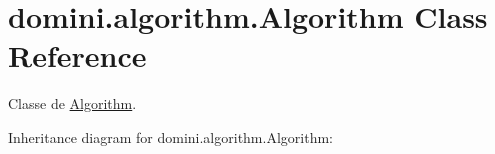 \hypertarget{classdomini_1_1algorithm_1_1Algorithm}{}\section{domini.\+algorithm.\+Algorithm Class Reference}
\label{classdomini_1_1algorithm_1_1Algorithm}


Classe de \hyperlink{classdomini_1_1algorithm_1_1Algorithm}{Algorithm}.  




Inheritance diagram for domini.\+algorithm.\+Algorithm\+:
